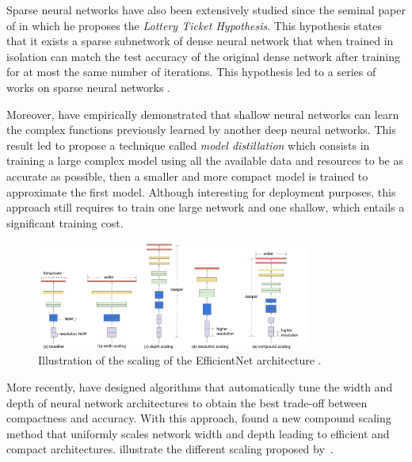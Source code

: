 Sparse neural networks have also been extensively studied since the seminal paper of \citet{frankle2018lottery} in which he proposes the \emph{Lottery Ticket Hypothesis}. 
This hypothesis states that it exists a sparse subnetwork of dense neural network that when trained in isolation can match the test accuracy of the original dense network after training for at most the same number of iterations. 
This hypothesis led to a series of works on sparse neural networks \cite{zhou2019deconstructing,malach2019proving,evci2020rigging}.

Moreover, \citet{ba2014deep} have empirically demonstrated that shallow neural networks can learn the complex functions previously learned by another deep neural networks.
This result led \citet{hinton2015distilling} to propose a technique called \emph{model distillation} which consists in training a large complex model using all the available data and resources to be as accurate as possible, then a smaller and more compact model is trained to approximate the first model.
Although interesting for deployment purposes, this approach still requires to train one large network and one shallow, which entails a significant training cost.

\begin{figure}[t]
  \centering
  \includegraphics[width=0.80\textwidth]{figures/main/ch3-related_work/scalecompare.pdf}
  \caption{Illustration of the scaling of the EfficientNet architecture \cite{tan2019efficientnet}.}
  \label{figure:p1-ch3-illustration_efficientnet}
\end{figure}

More recently, \citet{zoph2018learning,real2019regularized} have designed algorithms that automatically tune the width and depth of neural network architectures to obtain the best trade-off between compactness and accuracy.
With this approach, \citet{tan2019efficientnet} found a new compound scaling method that uniformly scales network width and depth leading to efficient and compact architectures.
 illustrate the different scaling proposed by~\citet{tan2019efficientnet}.


